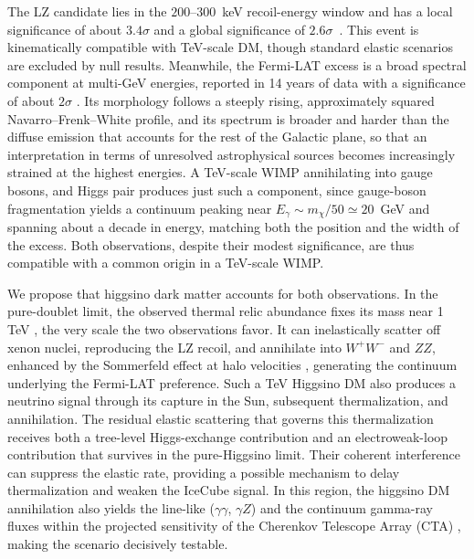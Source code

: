 \documentclass[%
  aps,
  prl,
  reprint,
  superscriptaddress,
  amsmath,
  amssymb,
  longbibliography
]{revtex4-2}
\begin{document}
The LZ candidate lies in the $200$--$300$~keV recoil-energy window and has a local significance of about $3.4\sigma$ and a global significance of $2.6\sigma$~\cite{LZ:2026HighEnergy}. This event is kinematically compatible with TeV-scale DM, though standard elastic scenarios are excluded by null results.
Meanwhile, the Fermi-LAT excess is a broad spectral component at multi-GeV energies, reported in 14 years of data with a significance of about $2\sigma$ \cite{Dessert:2022evk}. Its morphology follows a steeply rising, approximately squared Navarro--Frenk--White profile, and its spectrum is broader and harder than the diffuse emission that accounts for the rest of the Galactic plane, so that an interpretation in terms of unresolved astrophysical sources becomes increasingly strained at the highest energies.  A TeV-scale WIMP annihilating into gauge bosons, and Higgs pair produces just such a component, since gauge-boson fragmentation yields a continuum peaking near $E_\gamma\sim m_\chi/50\simeq 20$~GeV and spanning about a decade in energy, matching both the position and the width of the excess. Both observations, despite their modest significance, are thus compatible with a common origin in a TeV-scale WIMP.

We propose that higgsino dark matter accounts for both observations. In the pure-doublet limit, the observed thermal relic abundance fixes its mass near 1 TeV \cite{Arkani-Hamed:2006wnf,Jungman:1995df}, the very scale the two observations favor. It can inelastically scatter off xenon nuclei, reproducing the LZ recoil, and annihilate into $W^+W^-$ and $ZZ$, enhanced by the Sommerfeld effect at halo velocities \cite{Hisano:2004ds,Hisano:2006nn}, generating the continuum underlying the Fermi-LAT preference. Such a TeV Higgsino DM also produces a neutrino signal through its capture in the Sun, subsequent thermalization, and annihilation. The residual elastic scattering that governs this thermalization receives both a tree-level Higgs-exchange contribution and an electroweak-loop contribution that survives in the pure-Higgsino limit. Their coherent interference can suppress the elastic rate, providing a possible mechanism to delay thermalization and weaken the IceCube signal. In this region, the higgsino DM annihilation also yields the line-like ($\gamma\gamma$, $\gamma Z$) and the continuum gamma-ray fluxes within the projected sensitivity of the Cherenkov Telescope Array (CTA) \cite{Rodd:2024qsi}, making the scenario decisively testable.
\end{document}
